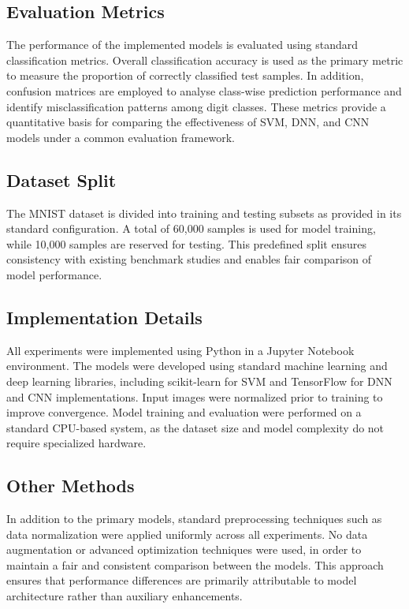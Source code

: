 \documentclass[11pt,a4paper]{article}
\begin{document}
	\subsection{Evaluation Metrics}
	
	The performance of the implemented models is evaluated using standard classification metrics. Overall classification accuracy is used as the primary metric to measure the proportion of correctly classified test samples. In addition, confusion matrices are employed to analyse class-wise prediction performance and identify misclassification patterns among digit classes. These metrics provide a quantitative basis for comparing the effectiveness of SVM, DNN, and CNN models under a common evaluation framework.
	
	\subsection{Dataset Split}
	
	The MNIST dataset is divided into training and testing subsets as provided in its standard configuration. A total of 60,000 samples is used for model training, while 10,000 samples are reserved for testing. This predefined split ensures consistency with existing benchmark studies and enables fair comparison of model performance.
	
	\subsection{Implementation Details}
	
	All experiments were implemented using Python in a Jupyter Notebook environment. The models were developed using standard machine learning and deep learning libraries, including scikit-learn for SVM and TensorFlow for DNN and CNN implementations. Input images were normalized prior to training to improve convergence. Model training and evaluation were performed on a standard CPU-based system, as the dataset size and model complexity do not require specialized hardware.
		
	\subsection{Other Methods}
	
	In addition to the primary models, standard preprocessing techniques such as data normalization were applied uniformly across all experiments. No data augmentation or advanced optimization techniques were used, in order to maintain a fair and consistent comparison between the models. This approach ensures that performance differences are primarily attributable to model architecture rather than auxiliary enhancements.
	
\end{document}
